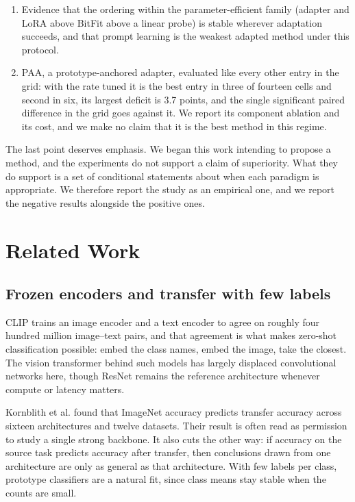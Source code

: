 \documentclass[preprint,12pt]{elsarticle}
\newcommand{\ours}{\textsc{PAA}}
\begin{document}
\begin{enumerate}
\item Evidence that the ordering within the parameter-efficient family (adapter
and LoRA above BitFit above a linear probe) is stable wherever adaptation
succeeds, and that prompt learning is the weakest adapted method under this
protocol.

\item \ours, a prototype-anchored adapter, evaluated like every other entry in
the grid: with the rate tuned it is the best entry in three of fourteen cells and
second in six, its largest deficit is 3.7 points, and the single significant
paired difference in the grid goes against it. We report its component ablation
and its cost, and we make no claim that it is the best method in this regime.
\end{enumerate}

The last point deserves emphasis. We began this work intending to propose a
method, and the experiments do not support a claim of superiority. What they do
support is a set of conditional statements about when each paradigm is
appropriate. We therefore report the study as an empirical one, and we report the
negative results alongside the positive ones.

\section{Related Work}

\subsection{Frozen encoders and transfer with few labels}

CLIP \cite{radford2021clip} trains an image encoder and a text encoder to agree
on roughly four hundred million image--text pairs, and that agreement is what
makes zero-shot classification possible: embed the class names, embed the image,
take the closest. The vision transformer behind such models
\cite{dosovitskiy2021vit} has largely displaced convolutional networks here,
though ResNet \cite{he2016resnet} remains the reference architecture whenever
compute or latency matters.

Kornblith et al. \cite{kornblith2019transfer} found that ImageNet accuracy
predicts transfer accuracy across sixteen architectures and twelve datasets.
Their result is often read as permission to study a single strong backbone. It
also cuts the other way: if accuracy on the source task predicts accuracy after
transfer, then conclusions drawn from one architecture are only as general as
that architecture. With few labels per class, prototype classifiers
\cite{snell2017prototypical} are a natural fit, since class means stay stable
when the counts are small.
\end{document}
